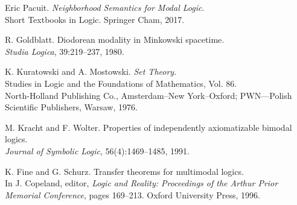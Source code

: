 \documentclass[12pt, a4paper]{scrartcl}
\begin{document}
\begin{enumerate}[label={[{\arabic*}]}]
\item Eric Pacuit. \textit{Neighborhood Semantics for Modal Logic}.\\
Short Textbooks in Logic. Springer Cham, 2017.

\item R. Goldblatt. Diodorean modality in Minkowski spacetime.\\
\textit{Studia Logica}, 39:219–237, 1980.

\item K. Kuratowski and A. Mostowski. \textit{Set Theory}.\\
Studies in Logic and the Foundations of Mathematics, Vol. 86.\\
North-Holland Publishing Co., Amsterdam–New York–Oxford; PWN—Polish Scientific Publishers, Warsaw, 1976.

\item M. Kracht and F. Wolter. Properties of independently axiomatizable bimodal logics.\\
\textit{Journal of Symbolic Logic}, 56(4):1469–1485, 1991.

\item K. Fine and G. Schurz. Transfer theorems for multimodal logics.\\
In J. Copeland, editor, \textit{Logic and Reality: Proceedings of the Arthur Prior Memorial Conference}, pages 169–213. Oxford University Press, 1996.

\end{enumerate}
\end{document}
